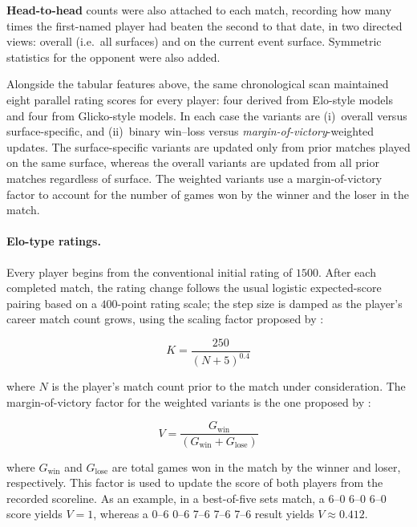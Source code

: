 \textbf{Head-to-head} counts were also attached to each match, recording how many times the
first-named player had beaten the second to that date, in two directed views: overall (i.e.\ all
surfaces) and on the current event surface. Symmetric statistics for the opponent were also added.

Alongside the tabular features above, the same chronological scan maintained eight parallel rating
scores for every player: four derived from Elo-style models and four from Glicko-style models.
In each case the variants are (i)~overall versus surface-specific, and (ii)~binary win--loss
versus \emph{margin-of-victory}-weighted updates. The surface-specific variants are updated only
from prior matches played on the same surface, whereas the overall variants are updated from all
prior matches regardless of surface. The weighted variants use a margin-of-victory factor to account
for the number of games won by the winner and the loser in the match.

\paragraph{Elo-type ratings.}
Every player begins from the conventional initial rating of $1500$. After each completed match, the
rating change follows the usual logistic expected-score pairing based on a $400$-point rating scale;
the step size is damped as the player's career match count grows, using the scaling factor proposed
by \textcite{kovalchik_2016}:

\begin{equation}
  K = \dfrac{250}{(N + 5)^{0.4}}
  \label{eq:elo-scale-factor}
\end{equation}

where $N$ is the player's match count prior to the match under consideration. The margin-of-victory
factor for the weighted variants is the one proposed by \textcite{angelini_2022}:

\begin{equation}
  V = \dfrac{G_{\mathrm{win}}}{(G_{\mathrm{win}} + G_{\mathrm{lose}})}
  \label{eq:margin-of-victory}
\end{equation}

where $G_{\mathrm{win}}$ and $G_{\mathrm{lose}}$ are total games won in the match by the winner and
loser, respectively. This factor is used to update the score of both players from the recorded
scoreline. As an example, in a best-of-five sets match, a 6--0 6--0 6--0 score yields $V = 1$,
whereas a 0--6 0--6 7--6 7--6 7--6 result yields $V \approx 0.412$.

